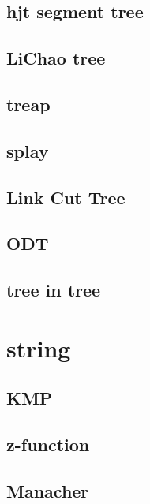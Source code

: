 \documentclass[UTF8, a4paper, titlepage, twoside]{ctexart}
\begin{document}
  \subsection{hjt segment tree}
    
    

  \subsection{LiChao tree}

  \subsection{treap}
    

  \subsection{splay}
    
    

  \subsection{Link Cut Tree}
  \subsection{ODT}
  \subsection{tree in tree}

\section{string}
  \subsection{KMP}
    

  \subsection{z-function}
    

  \subsection{Manacher}
    
\end{document}
